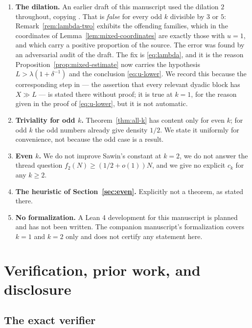 \documentclass[11pt]{article}
\begin{document}
\begin{enumerate}
      multiplier only changes the relevant \(D\) and \(Y\) by bounded
      factors. We have checked that no exponent changes, but we have not
      rewritten those two dyadic splittings in full here.
\item \textbf{The dilation.} An earlier draft of this manuscript used the
      dilation \(2\) throughout, copying \cite{DellaPietra2026}. That is
      \emph{false} for every odd \(k\) divisible by \(3\) or \(5\):
      Remark~\ref{rem:lambda-two} exhibits the offending families, which in the
      coordinates of Lemma~\ref{lem:mixed-coordinates} are exactly those with
      \(u=1\), and which carry a positive proportion of the source. The error
      was found by an adversarial audit of the draft. The fix is
      \eqref{eq:lambda}, and it is the reason
      Proposition~\ref{prop:mixed-estimate} now carries the hypothesis
      \(L>\lambda(1+\delta^{-1})\) and the conclusion \eqref{eq:u-lower}. We
      record this because the corresponding step in \cite{DellaPietra2026} ---
      the assertion that every relevant dyadic block has \(X\gg L\) --- is
      stated there without proof; it is true at \(k=1\), for the reason given
      in the proof of \eqref{eq:u-lower}, but it is not automatic.
\item \textbf{Triviality for odd \(k\).} Theorem~\ref{thm:all-k} has content
      only for even \(k\); for odd \(k\) the odd numbers already give density
      \(1/2\). We state it uniformly for convenience, not because the odd
      case is a result.
\item \textbf{Even \(k\).} We do not improve Sawin's constant at \(k=2\), we
      do not answer the thread question \(f_2(N)\geq(1/2+o(1))N\), and we
      give no explicit \(c_k\) for any \(k\geq2\).
\item \textbf{The heuristic of Section~\ref{sec:even}.} Explicitly not a theorem, as
      stated there.
\item \textbf{No formalization.} A Lean 4 development for this manuscript is
      planned and has not been written. The companion manuscript's
      formalization covers \(k=1\) and \(k=2\) only and does not certify any
      statement here.
\end{enumerate}

\section{Verification, prior work, and disclosure}\label{sec:repro}

\subsection{The exact verifier}
\end{document}
